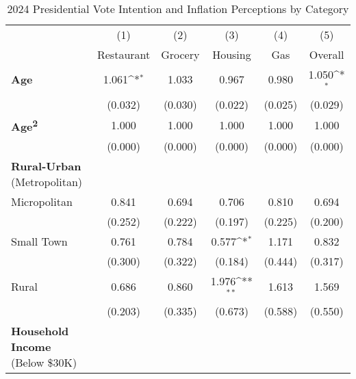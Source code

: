 \begin{table}[htbp]\centering \scriptsize
\label{tab:vot}
\def\sym#1{\ifmmode^{#1}\else\(^{#1}\)\fi}
\caption{2024 Presidential Vote Intention and Inflation Perceptions by Category}
\begin{tabular}{l*{5}{c}}
\hline\hline
                    &\multicolumn{1}{c}{(1)}&\multicolumn{1}{c}{(2)}&\multicolumn{1}{c}{(3)}&\multicolumn{1}{c}{(4)}&\multicolumn{1}{c}{(5)}\\
                    &\multicolumn{1}{c}{Restaurant}&\multicolumn{1}{c}{Grocery}&\multicolumn{1}{c}{Housing}&\multicolumn{1}{c}{Gas}&\multicolumn{1}{c}{Overall}\\
\hline
\textbf{Age}        &       1.061\sym{*}  &       1.033         &       0.967         &       0.980         &       1.050\sym{*}  \\
                    &     (0.032)         &     (0.030)         &     (0.022)         &     (0.025)         &     (0.029)         \\
\textbf{Age\textsuperscript{2}}&       1.000         &       1.000         &       1.000         &       1.000         &       1.000         \\
                    &     (0.000)         &     (0.000)         &     (0.000)         &     (0.000)         &     (0.000)         \\
\textbf{Rural-Urban} (Metropolitan) &  &  &  &   & \\
Micropolitan        &       0.841         &       0.694         &       0.706         &       0.810         &       0.694         \\
                    &     (0.252)         &     (0.222)         &     (0.197)         &     (0.225)         &     (0.200)         \\
Small Town          &       0.761         &       0.784         &       0.577\sym{*}  &       1.171         &       0.832         \\
                    &     (0.300)         &     (0.322)         &     (0.184)         &     (0.444)         &     (0.317)         \\
Rural               &       0.686         &       0.860         &       1.976\sym{**} &       1.613         &       1.569         \\
                    &     (0.203)         &     (0.335)         &     (0.673)         &     (0.588)         &     (0.550)         \\
\textbf{Household Income} (Below \$30K) &  &  &  &   & \\

\end{tabular}
\end{table}
